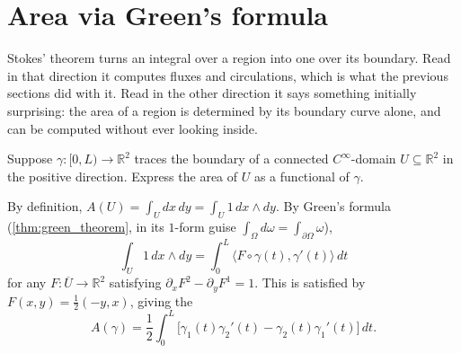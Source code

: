 
\section{Area via Green's formula}
\label{sec:area_via_green}

Stokes' theorem turns an integral over a region into one over its boundary. Read in that
direction it computes fluxes and circulations, which is what the previous sections did with it.
Read in the other direction it says something initially surprising: the area of a region is
determined by its boundary curve alone, and can be computed without ever looking inside.

\begin{example}
\label{ex:area_boundary_functional}
Suppose $\gamma : [0,L) \to \mathbb{R}^2$ traces the boundary of a connected $C^\infty$-domain
$U \subseteq \mathbb{R}^2$ in the positive direction. Express the area of $U$ as a functional
of $\gamma$.

\medskip
By definition, $A(U) = \int_U dx\,dy = \int_U 1\,dx\wedge dy$. By Green's formula
(\cref{thm:green_theorem}, in its $1$-form guise $\int_\Omega d\omega =
\int_{\partial\Omega}\omega$),
\[\int_U 1\,dx\wedge dy = \int_0^L \langle F\circ\gamma(t),\gamma'(t)\rangle\,dt\]
for any $F : \overline U \to \mathbb{R}^2$ satisfying $\partial_xF^2 - \partial_yF^1 = 1$. This
is satisfied by $F(x,y) = \tfrac12(-y,x)$, giving the 
\[A(\gamma) = \frac12\int_0^L \big[\gamma_1(t)\gamma_2'(t) - \gamma_2(t)\gamma_1'(t)\big]\,dt.\]
\end{example}

